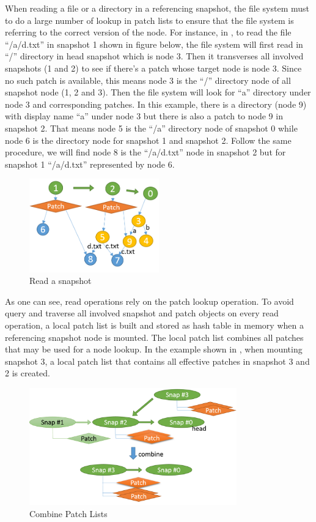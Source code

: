     When reading a file or a directory in a referencing snapshot, the file system must to do a large number of lookup in patch lists to ensure that the file system is referring to the correct version of the node. For instance, in , to read the file ``/a/d.txt'' in snapshot 1 shown in figure below, the file system will first read in ``/'' directory in head snapshot which is node 3. Then it transverses all involved snapshots (1 and 2) to see if there's a patch whose target node is node 3. Since no such patch is available, this means node 3 is the ``/'' directory node of all snapshot node (1, 2 and 3). Then the file system will look for “a” directory under node 3 and corresponding patches. In this example, there is a directory (node 9) with display name “a” under node 3 but there is also a patch to node 9 in snapshot 2. That means node 5 is the ``/a'' directory node of snapshot 0 while node 6 is the directory node for snapshot 1 and snapshot 2. Follow the same procedure, we will find node 8 is the ``/a/d.txt'' node in snapshot 2 but for snapshot 1 ``/a/d.txt'' represented by node 6.

\begin{figure}[t]
\centering
\includegraphics[width=0.5\textwidth]{Chapter-4/figs/fig18.png}
\caption{Read a snapshot}
\label{fig:read_patches}
\end{figure}

    As one can see, read operations rely on the patch lookup operation. To avoid query and traverse all involved snapshot and patch objects on every read operation, a local patch list is built and stored as hash table in memory when a referencing snapshot node is mounted. The local patch list combines all patches that may be used for a node lookup. In the example shown in , when mounting snapshot 3, a local patch list that contains all effective patches in snapshot 3 and 2 is created.

\begin{figure}[t]
\centering
\includegraphics[width=0.8\textwidth]{Chapter-4/figs/fig15.png}
\caption{Combine Patch Lists}
\label{fig:combine_patch_list}
\end{figure}

